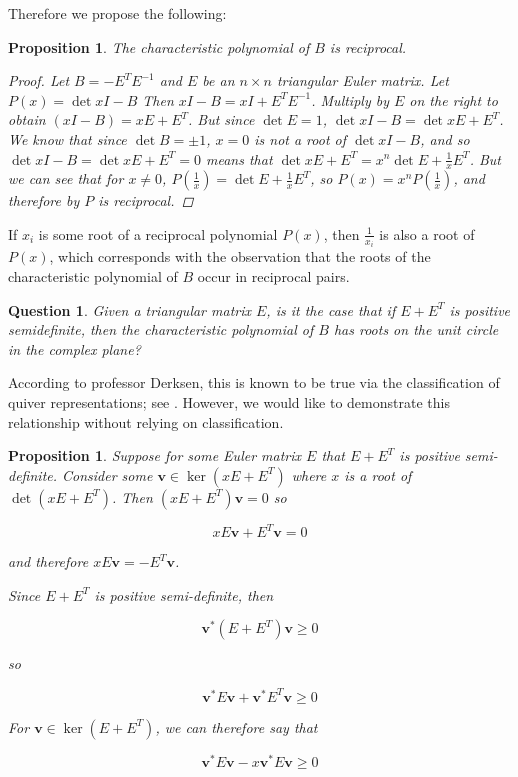 \documentclass{amsart}
\theoremstyle{theorem}
\theoremstyle{theorem*}
\newtheorem{proposition}[theorem]{Proposition}
\newtheorem{question}[theorem]{Question}
\theoremstyle{definition}
\begin{document}
Therefore we propose the following:

\begin{proposition}
    The characteristic polynomial of $B$ is reciprocal.
    \begin{proof}
        Let $B = - E^T E^{-1}$ and $E$ be an $n \times n$ triangular Euler matrix. Let $P(x) = \det{xI - B}$
        Then $xI - B = xI + E^T E^{-1}$. Multiply by $E$ on the right to obtain
        $(xI - B) = xE + E^T$. But since $\det{E} = 1$, $\det{xI - B} = \det{xE + E^T}$.
        We know that since $\det{B} = \pm 1$, $x = 0$ is not a root of $\det{xI - B}$,
        and so $\det{xI - B} = \det{xE + E^T} = 0$ means that 
        $\det{xE+E^T} = x^n \det{E + \frac{1}{x} E^T}$. But we can see that for $x \neq 0$,
        $P(\frac{1}{x}) = \det{E + \frac{1}{x} E^T}$, so $P(x) = x^n P(\frac{1}{x})$,
        and therefore by \cite{syz}  $P$ is reciprocal.
    \end{proof}
\end{proposition}

If $x_i$ is some root of a reciprocal polynomial $P(x)$, 
then $\frac{1}{x_i}$ is also a root of $P(x)$, which corresponds with the observation
that the roots of the characteristic polynomial of $B$ occur in reciprocal pairs.

\begin{question}
    Given a triangular matrix $E$, is it the case that if $E + E^T$ is positive semidefinite,
    then the characteristic polynomial of $B$ has roots on the unit circle in the complex plane?
\end{question}

According to professor Derksen, this is known to be true via the classification
of quiver representations; see \cite{dw}. However, we would like to demonstrate
this relationship without relying on classification.

\begin{proposition}
    Suppose for some Euler matrix $E$ that $E + E^T$ is positive
    semi-definite. Consider some $\textbf{v} \in \ker(xE + E^T)$
    where $x$ is a root of $\det(xE+E^T)$.
    Then $(xE + E^T) \textbf{v} = 0$ so

    $$x E \textbf{v} + E^T \textbf{v} = 0$$

    and therefore $x E \textbf{v} = - E^T \textbf{v}$.

    Since $E + E^T$ is positive semi-definite, then

    $$\textbf{v}^* (E + E^T) \textbf{v} \geq 0$$

    so

    $$ \textbf{v}^* E \textbf{v} + \textbf{v}^* E^T \textbf{v} \geq 0$$

    For $\textbf{v} \in \ker(E + E^T)$, we can therefore say that

    $$\textbf{v}^* E \textbf{v} - x \textbf{v}^* E \textbf{v} \geq 0$$


\end{proposition}
\end{document}
